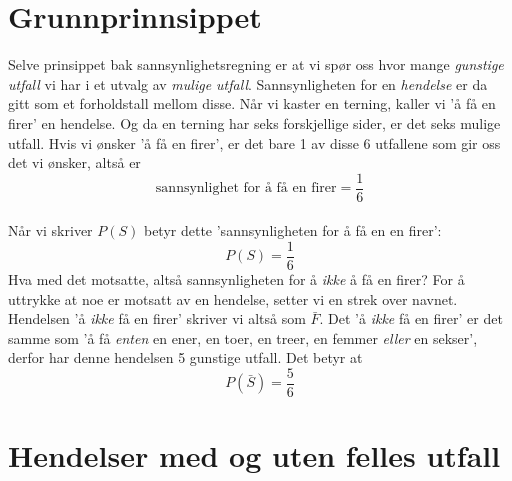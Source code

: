 

%

\section{Grunnprinnsippet}
Selve prinsippet bak sannsynlighetsregning er at vi spør oss hvor mange \textit{gunstige utfall}  vi har i et utvalg av \textit{mulige utfall}. Sannsynligheten for en \textit{hendelse} er da gitt som et forholdstall mellom disse. \regv
{} \vsk
Når vi kaster en terning, kaller vi 'å få en firer' en hendelse. Og da en terning har seks forskjellige sider, er det seks mulige utfall.
Hvis vi ønsker 'å få en firer', er det bare 1 av disse 6 utfallene som gir oss det vi ønsker, altså er
\[ \text{sannsynlighet for å få en firer}=
 \frac{1}{6} \]
\qquad {} \\[5pt]
Når vi skriver $P(S)$ betyr dette 'sannsynligheten for å få en en firer':
\[ P(S)=\frac{1}{6} \]
Hva med det motsatte, altså sannsynligheten for å \textsl{ikke} å få en firer? For å uttrykke at noe er motsatt av en hendelse, setter vi en strek over navnet. Hendelsen 'å \textsl{ikke} få en firer' skriver vi altså som $ \bar{F} $. Det 'å \textsl{ikke} få en firer' er det samme som 'å få \textsl{enten} en ener, en toer, en treer, en femmer \textsl{eller} en sekser', derfor har denne hendelsen 5 gunstige utfall. Det betyr at
\[ P(\bar{S})=\frac{5}{6} \]
\section{Hendelser med og uten felles utfall}
